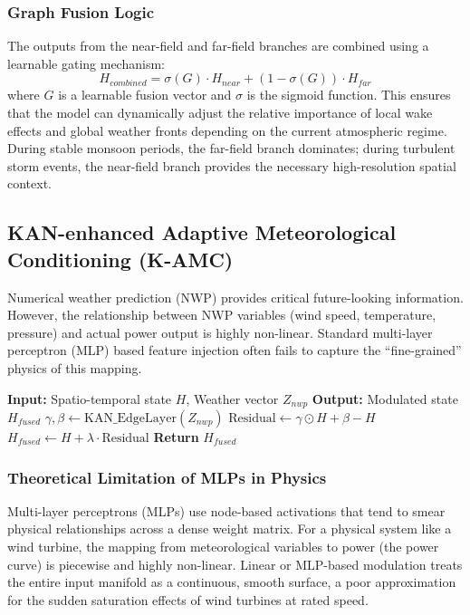 \subsubsection{Graph Fusion Logic}
\label{sec:rstmf_fusion}
The outputs from the near-field and far-field branches are combined using a learnable gating mechanism:
\begin{equation}
H_{combined} = \sigma(G) \cdot H_{near} + (1 - \sigma(G)) \cdot H_{far}
\end{equation}
where $G$ is a learnable fusion vector and $\sigma$ is the sigmoid function. This ensures that the model can dynamically adjust the relative importance of local wake effects and global weather fronts depending on the current atmospheric regime. During stable monsoon periods, the far-field branch dominates; during turbulent storm events, the near-field branch provides the necessary high-resolution spatial context.

\subsection{KAN-enhanced Adaptive Meteorological Conditioning (K-AMC)}
\label{sec:kamc}
Numerical weather prediction (NWP) provides critical future-looking information. However, the relationship between NWP variables (wind speed, temperature, pressure) and actual power output is highly non-linear. Standard multi-layer perceptron (MLP) based feature injection often fails to capture the ``fine-grained'' physics of this mapping.

\begin{algorithm}[H]
\caption{K-AMC Non-linear Weather Modulation}
\begin{algorithmic}[1]
\STATE \textbf{Input:} Spatio-temporal state $H$, Weather vector $Z_{nwp}$
\STATE \textbf{Output:} Modulated state $H_{fused}$
\STATE $\gamma, \beta \gets \text{KAN\_EdgeLayer}(Z_{nwp})$
\STATE $\text{Residual} \gets \gamma \odot H + \beta - H$
\STATE $H_{fused} \gets H + \lambda \cdot \text{Residual}$ 
\STATE \textbf{Return} $H_{fused}$
\end{algorithmic}
\label{alg:kamc_modulation}
\end{algorithm}

\subsubsection{Theoretical Limitation of MLPs in Physics}
\label{sec:mlp_limits}
Multi-layer perceptrons (MLPs) use node-based activations that tend to smear physical relationships across a dense weight matrix. For a physical system like a wind turbine, the mapping from meteorological variables to power (the power curve) is piecewise and highly non-linear. Linear or MLP-based modulation treats the entire input manifold as a continuous, smooth surface, a poor approximation for the sudden saturation effects of wind turbines at rated speed.

